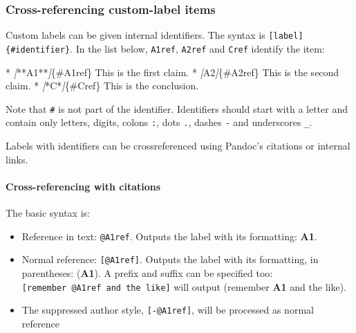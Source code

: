 \documentclass[
]{article}
\newenvironment{Shaded}{}{}
\newcommand{\CommentTok}[1]{\textcolor[rgb]{0.38,0.63,0.69}{\textit{#1}}}
\newcommand{\NormalTok}[1]{#1}
\newcommand{\OtherTok}[1]{\textcolor[rgb]{0.00,0.44,0.13}{#1}}
\newcommand{\SpecialStringTok}[1]{\textcolor[rgb]{0.73,0.40,0.53}{#1}}
\providecommand{\tightlist}{%
  \setlength{\itemsep}{0pt}\setlength{\parskip}{0pt}}
\begin{document}
\hypertarget{cross-referencing-custom-label-items}{%
\subsubsection{Cross-referencing custom-label
items}\label{cross-referencing-custom-label-items}}

Custom labels can be given internal identifiers. The syntax is
\texttt{{[}label{]}\{\#identifier\}}. In the list below, \texttt{A1ref},
\texttt{A2ref} and \texttt{Cref} identify the item:

\begin{Shaded}
\begin{Highlighting}[]
\SpecialStringTok{* }\CommentTok{[}\OtherTok{**A1**}\CommentTok{]}\NormalTok{\{\#A1ref\} This is the first claim.}
\SpecialStringTok{* }\CommentTok{[}\OtherTok{A2}\CommentTok{]}\NormalTok{\{\#A2ref\} This is the second claim.}
\SpecialStringTok{* }\CommentTok{[}\OtherTok{*C*}\CommentTok{]}\NormalTok{\{\#Cref\} This is the conclusion.}
\end{Highlighting}
\end{Shaded}

Note that \texttt{\#} is not part of the identifier. Identifiers should
start with a letter and contain only letters, digits, colons \texttt{:},
dots \texttt{.}, dashes \texttt{-} and underscores \texttt{\_}.

Labels with identifiers can be crossreferenced using Pandoc's citations
or internal links.

\hypertarget{cross-referencing-with-citations}{%
\paragraph{Cross-referencing with
citations}\label{cross-referencing-with-citations}}

The basic syntax is:

\begin{itemize}
\tightlist
\item
  Reference in text: \texttt{@A1ref}. Outputs the label with its
  formatting: \textbf{A1}.
\item
  Normal reference: \texttt{{[}@A1ref{]}}. Outputs the label with its
  formatting, in parentheses: (\textbf{A1}). A prefix and suffix can be
  specified too: \texttt{{[}remember\ @A1ref\ and\ the\ like{]}} will
  output (remember \textbf{A1} and the like).
\item
  The suppressed author style, \texttt{{[}-@A1ref{]}}, will be processed
  as normal reference
\end{itemize}
\end{document}
